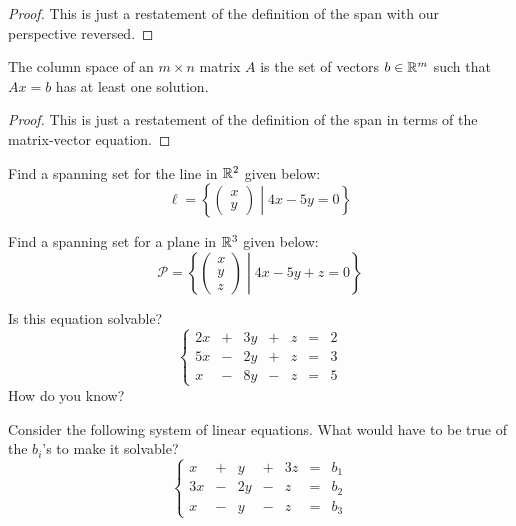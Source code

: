 \documentclass[elementsmain.tex]{subfiles}
\begin{document}
\begin{proof} This is just a restatement of the definition of the span with our perspective reversed.
\end{proof}



\begin{theorem}
The column space of an $m\times n$ matrix $A$ is the set of vectors $b \in \mathbb{R}^m$ such that $Ax=b$ has at least one solution.
\end{theorem}

\begin{proof} This is just a restatement of the definition of the span in terms of the matrix-vector equation.
\end{proof}



\clearpage

\begin{exercise}
Find a spanning set for the line in $\mathbb{R}^2$ given below:
\[
\ell = \left\{ \begin{pmatrix} x \\ y \end{pmatrix} \middle| 4x - 5y = 0 \right\}
\]
\end{exercise}

\begin{exercise}
Find a spanning set for a plane in $\mathbb{R}^3$ given below:
\[
\mathcal{P} = \left\{ \begin{pmatrix} x \\ y \\ z\end{pmatrix} 
\middle| 4x - 5y + z = 0 \right\}
\]
\end{exercise}


\begin{exercise}
Is this equation solvable?
\begin{equation*}
\left\{
\begin{array}{rrrrrrr}
2x & + & 3y & + & z & = & 2 \\
5x & - & 2y & + & z & = & 3 \\
x & - & 8y & - & z & = & 5 
\end{array}
\right.
\end{equation*}
How do you know?
\end{exercise}


\begin{exercise}
Consider the following system of linear equations. What would have to be true of the $b_i$'s to make it solvable?
\begin{equation*}
\left\{
\begin{array}{rrrrrrr}
 x & + & y & + & 3z & = & b_1 \\
3x & - & 2y & - & z & = & b_2 \\
 x & - & y & - & z & = & b_3 
\end{array}
\right.
\end{equation*}
\end{exercise}
\end{document}
